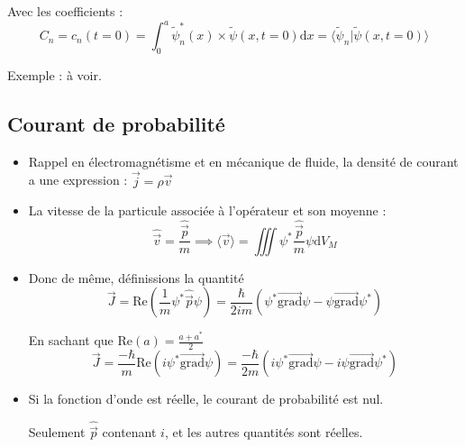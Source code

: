 Avec les coefficients : 
\begin{equation}
  C_n = c_n(t = 0) = \int_{0}^{a} \widetilde \psi _n ^{*}(x) \times \widetilde \psi(x, t = 0) \mathrm{d}x = \langle \widetilde \psi _n | \widetilde \psi (x, t = 0)\rangle 
\end{equation}

Exemple : à voir.

\subsection{Courant de probabilité} %
\label{sec:Courant de probabilité}

\begin{itemize}
    \item Rappel en électromagnétisme et en mécanique de fluide, la densité de courant a une expression : $\overrightarrow{j} = \rho \overrightarrow{v}$

    \item La vitesse de la particule associée à l'opérateur et son moyenne : 
      \begin{equation}
        \hat{\overrightarrow{v}} = \frac{\hat{\overrightarrow{p}}}{m}  \implies \langle \overrightarrow{v} \rangle = \iiint \psi ^{*} \frac{\hat{\overrightarrow{p}}}{m} \psi \mathrm{d} V_M
      \end{equation}

    \item Donc de même, définissions la quantité 
      \begin{equation}
        \boxed{        \overrightarrow{J} = \mathrm{Re} \left( \frac{1}{m} \psi ^{*} \hat{\overrightarrow{p}} \psi \right)} = \frac{\hbar}{2im} \left( \psi ^{*} \overrightarrow{\mathrm{grad}} \psi - \psi \overrightarrow{\mathrm{grad}} \psi ^{*}\right)
      \end{equation}

      \begin{myproof}{En sachant que $\mathrm{Re}(a) = \frac{a+ a ^{*}}{2} $}{}
      \begin{equation}
        \overrightarrow{J} = \frac{- \hbar}{m} \mathrm{Re}(i \psi ^{*} \overrightarrow{\mathrm{grad}} \psi) = \frac{- \hbar}{2m}  (i \psi ^{*} \overrightarrow{\mathrm{grad}} \psi - i \psi \overrightarrow{\mathrm{grad}} \psi ^{*})
      \end{equation}
      \end{myproof}

    \item Si la fonction d'onde est réelle, le courant de probabilité est nul.  
      \begin{myproof}{}{}
      Seulement $\hat{\overrightarrow{p}}$ contenant $i$, et les autres quantités sont réelles.
      \end{myproof}


\end{itemize}

